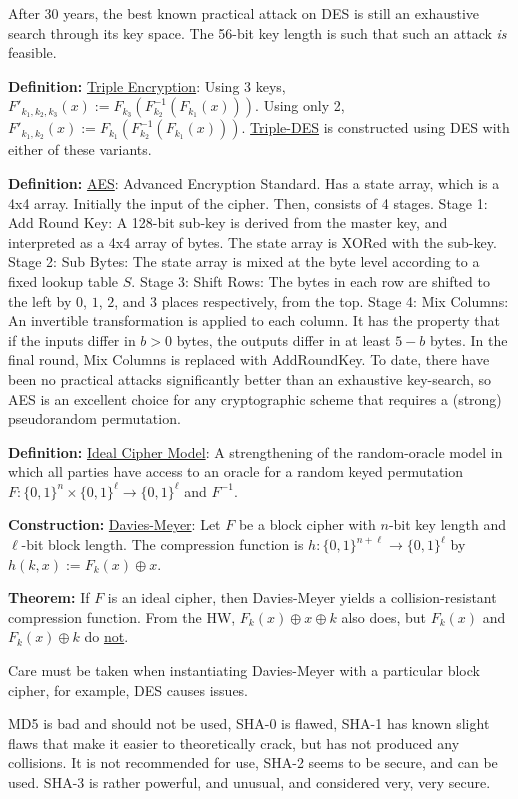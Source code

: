 \documentclass[10pt]{article}
\newcommand{\defn}[1]{{\bf Definition:} \underline{#1}}
\newcommand{\thm}[1]{{\bf Theorem:} \underline{#1}}
\newcommand{\con}[1]{{\bf Construction:} \underline{#1}}
\newcommand{\xor}{\oplus}
\begin{document}
\begin{multicols}{5}
After 30 years, the best known practical attack on DES is still an exhaustive search through its key space. The 56-bit key length is such that such an attack {\it is} feasible.

\defn{Triple Encryption}: Using 3 keys, $F'_{k_1,k_2,k_3}(x):=F_{k_3}(F_{k_2}^{-1}(F_{k_1}(x)))$. Using only 2, $F'_{k_1,k_2}(x):=F_{k_1}(F_{k_2}^{-1}(F_{k_1}(x)))$. \underline{Triple-DES} is constructed using DES with either of these variants.

\defn{AES}: Advanced Encryption Standard. Has a state array, which is a 4x4 array. Initially the input of the cipher. Then, consists of 4 stages. Stage 1: Add Round Key: A 128-bit sub-key is derived from the master key, and interpreted as a 4x4 array of bytes. The state array is XORed with the sub-key. Stage 2: Sub Bytes: The state array is mixed at the byte level according to a fixed lookup table $S$. Stage 3: Shift Rows: The bytes in each row are shifted to the left by $0$, $1$, $2$, and $3$ places respectively, from the top. Stage 4: Mix Columns: An invertible transformation is applied to each column. It has the property that if the inputs differ in $b>0$ bytes, the outputs differ in at least $5-b$ bytes. In the final round, Mix Columns is replaced with AddRoundKey. To date, there have been no practical attacks significantly better than an exhaustive key-search, so AES is an excellent choice for any cryptographic scheme that requires a (strong) pseudorandom permutation.

\defn{Ideal Cipher Model}: A strengthening of the random-oracle model in which all parties have access to an oracle for a random keyed permutation $F:\{0,1\}^n\times\{0,1\}^\ell\to\{0,1\}^\ell$ and $F^{-1}$.

\con{Davies-Meyer}: Let $F$ be a block cipher with $n$-bit key length and $\ell$-bit block length. The compression function is $h:\{0,1\}^{n+\ell}\to\{0,1\}^\ell$ by $h(k,x):=F_k(x)\xor x$.

\thm{}If $F$ is an ideal cipher, then Davies-Meyer yields a collision-resistant compression function. From the HW, $F_k(x)\xor x\xor k$ also does, but $F_k(x)$ and $F_k(x)\xor k$ do \underline{not}.

Care must be taken when instantiating Davies-Meyer with a particular block cipher, for example, DES causes issues.

MD5 is bad and should not be used, SHA-0 is flawed, SHA-1 has known slight flaws that make it easier to theoretically crack, but has not produced any collisions. It is not recommended for use, SHA-2 seems to be secure, and can be used. SHA-3 is rather powerful, and unusual, and considered very, very secure.


\end{multicols}
\end{document}
